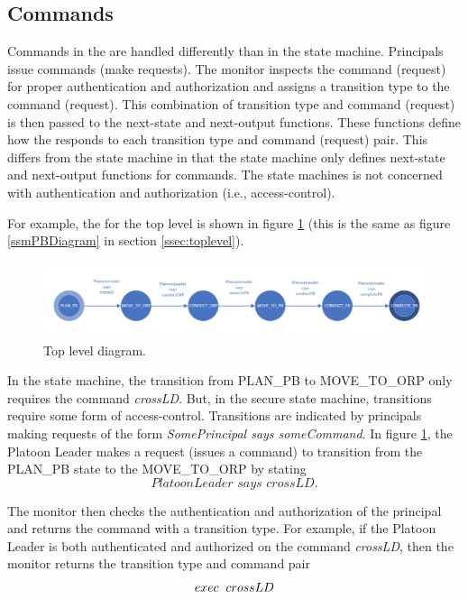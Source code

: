 \documentclass[../../main/main.tex]{subfiles}
\begin{document}
\subsection{Commands}
Commands in the  are handled differently than in the state machine.  Principals issue commands (make requests).  The monitor inspects the command (request) for proper authentication and authorization and assigns a transition type to the command (request).  This combination of transition type and command (request) is then passed to the next-state and next-output functions.  These functions define how the  responds to each transition type and command (request) pair.  This differs from the state machine in that the state machine only defines next-state and next-output functions for commands.  The state machines is not concerned with authentication and authorization (i.e., access-control).

For example, the  for the top level is shown in figure \ref{ssmPBDiagram2} (this is the same as figure \ref{ssmPBDiagram} in section \ref{ssec:toplevel}).  

\begin{figure}[h!]
\centering
\includegraphics[width=\textwidth]{../figures/ssmPBDiagram}
\caption{\label{ssmPBDiagram2} Top level diagram.}
\end{figure}

In the state machine, the transition from PLAN_PB to MOVE_TO_ORP only requires the command \textit{crossLD}.  But, in the secure state machine, transitions require some form of access-control.  Transitions are indicated by principals making requests of the form \textit{SomePrincipal says someCommand}.  In figure \ref{ssmPBDiagram2}, the Platoon Leader makes a request (issues a command) to transition from the PLAN_PB state to the MOVE_TO_ORP by stating 
 \[\textit{PlatoonLeader says crossLD}.\]

The monitor then checks the authentication and authorization of the principal and returns the command with a transition type.  For example, if the Platoon Leader is both authenticated and authorized on the command \textit{crossLD}, then the monitor returns the transition type and command pair 
\[exec \hspace{0.2cm} crossLD\]
\end{document}
